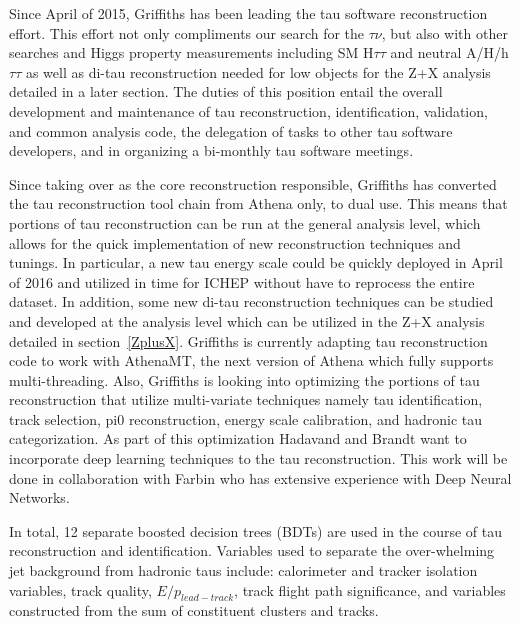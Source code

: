\label{tau-reco}
Since April of 2015, Griffiths has been leading the tau software reconstruction effort.  This effort not only compliments our search for the \Hp \too $\tau \nu$, but also with other searches and Higgs property measurements 
including SM H\too $\tau\tau$ and neutral A/H/h \too $\tau\tau$ as well as di-tau reconstruction needed for low \pt objects for the Z+X analysis detailed in a later section.  
The duties of this position entail the overall development and maintenance of tau reconstruction, identification, validation, and common analysis code, the delegation 
of tasks to other tau software developers, and in organizing a bi-monthly tau software meetings.

Since taking over as the core reconstruction responsible, Griffiths has converted the tau reconstruction tool chain from Athena only, to dual use.  
This means that portions of tau reconstruction can be run at the general analysis level, which allows for the quick implementation of new reconstruction techniques and tunings.  
In particular, a new tau energy scale could be quickly deployed in April of 2016 and utilized in time for ICHEP without have to reprocess the entire dataset.  
In addition, some new di-tau reconstruction techniques can be studied and developed at the analysis level which can be utilized in the Z+X analysis detailed in section~\ref{ZplusX}.
Griffiths is currently adapting tau reconstruction code to work with AthenaMT, the next version of Athena which fully supports multi-threading. 
Also, Griffiths is looking into optimizing the portions of tau reconstruction that utilize multi-variate techniques  namely tau identification, track selection, pi0 reconstruction, energy scale calibration, and hadronic tau categorization.
As part of this optimization Hadavand and Brandt want to incorporate deep learning techniques to the tau reconstruction. This work will be done in collaboration with Farbin who has extensive experience with Deep Neural Networks.

In total, 12 separate boosted decision trees (BDTs) are used in the course of tau reconstruction and identification.  Variables used to separate the over-whelming jet background from hadronic taus include: calorimeter and tracker isolation variables, track quality, $E/p_{lead-track}$, track flight path significance, and variables constructed from the sum of constituent clusters and tracks.   
